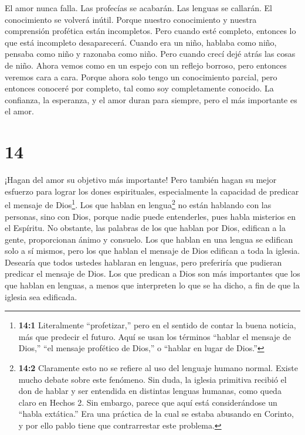  El amor nunca falla. Las profecías se acabarán. Las lenguas
se callarán. El conocimiento se volverá inútil.  Porque
nuestro conocimiento y nuestra comprensión profética están incompletos.
 Pero cuando esté completo, entonces lo que está incompleto
desaparecerá.  Cuando era un niño, hablaba como niño,
pensaba como niño y razonaba como niño. Pero cuando crecí dejé atrás las
cosas de niño.  Ahora vemos como en un espejo con un
reflejo borroso, pero entonces veremos cara a cara. Porque ahora solo
tengo un conocimiento parcial, pero entonces conoceré por completo, tal
como soy completamente conocido.  La confianza, la
esperanza, y el amor duran para siempre, pero el más importante es el
amor.

\hypertarget{section-13}{%
\section{14}\label{section-13}}

 ¡Hagan del amor su objetivo más importante! Pero también
hagan su mejor esfuerzo para lograr los dones espirituales,
especialmente la capacidad de predicar el mensaje de Dios\footnote{\textbf{14:1}
  Literalmente ``profetizar,'' pero en el sentido de contar la buena
  noticia, más que predecir el futuro. Aquí se usan los términos
  ``hablar el mensaje de Dios,'' ``el mensaje profético de Dios,'' o
  ``hablar en lugar de Dios.''}.  Los que hablan en
lengua\footnote{\textbf{14:2} Claramente esto no se refiere al uso del
  lenguaje humano normal. Existe mucho debate sobre este fenómeno. Sin
  duda, la iglesia primitiva recibió el don de hablar y ser entendida en
  distintas lenguas humanas, como queda claro en Hechos 2. Sin embargo,
  parece que aquí está considerándose un ``habla extática.'' Era una
  práctica de la cual se estaba abusando en Corinto, y por ello pablo
  tiene que contrarrestar este problema.} no están hablando con las
personas, sino con Dios, porque nadie puede entenderles, pues habla
misterios en el Espíritu.  No obstante, las palabras de los
que hablan por Dios, edifican a la gente, proporcionan ánimo y consuelo.
 Los que hablan en una lengua se edifican solo a sí mismos,
pero los que hablan el mensaje de Dios edifican a toda la iglesia.
Desearía que todos ustedes hablaran en lenguas, pero preferiría que
pudieran predicar el mensaje de Dios.  Los que predican a
Dios son más importantes que los que hablan en lenguas, a menos que
interpreten lo que se ha dicho, a fin de que la iglesia sea edificada.

